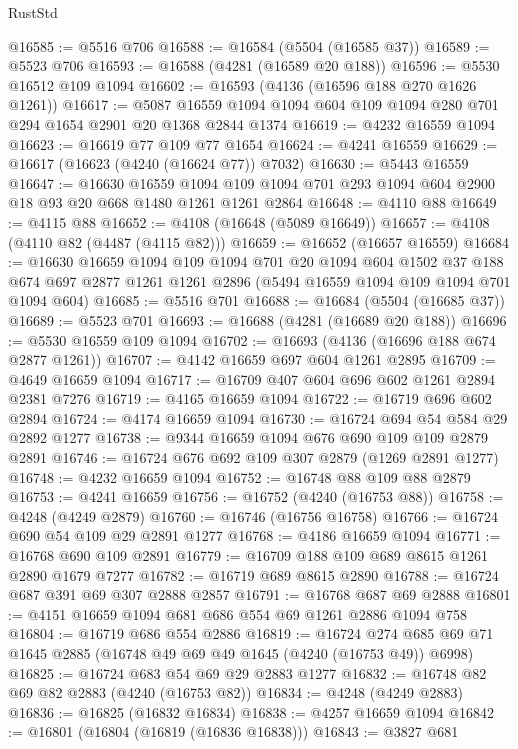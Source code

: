 \begin{lexlean}{RustStd}
\begin{coremodule}
{\begin{coremodule}
{{{{{{{{{{{{{{{{{{{{{{{{{{{{{{{{{{{@16585 := @5516 @706
@16588 := @16584 (@5504 (@16585 @37))
@16589 := @5523 @706
@16593 := @16588 (@4281 (@16589 @20 @188))
@16596 := @5530 @16512 @109 @1094
@16602 := @16593 (@4136 (@16596 @188 @270 @1626 @1261))
@16617 := @5087 @16559 @1094 @1094 @604 @109 @1094 @280 @701 @294 @1654 @2901 @20 @1368 @2844 @1374
@16619 := @4232 @16559 @1094
@16623 := @16619 @77 @109 @77 @1654
@16624 := @4241 @16559
@16629 := @16617 (@16623 (@4240 (@16624 @77)) @7032)
@16630 := @5443 @16559
@16647 := @16630
    @16559
    @1094
    @109
    @1094
    @701
    @293
    @1094
    @604
    @2900
    @18
    @93
    @20
    @668
    @1480
    @1261
    @1261
    @2864
@16648 := @4110 @88
@16649 := @4115 @88
@16652 := @4108 (@16648 (@5089 @16649))
@16657 := @4108 (@4110 @82 (@4487 (@4115 @82)))
@16659 := @16652 (@16657 @16559)
@16684 := @16630
    @16659
    @1094
    @109
    @1094
    @701
    @20
    @1094
    @604
    @1502
    @37
    @188
    @674
    @697
    @2877
    @1261
    @1261
    @2896
    (@5494 @16559 @1094 @109 @1094 @701 @1094 @604)
@16685 := @5516 @701
@16688 := @16684 (@5504 (@16685 @37))
@16689 := @5523 @701
@16693 := @16688 (@4281 (@16689 @20 @188))
@16696 := @5530 @16559 @109 @1094
@16702 := @16693 (@4136 (@16696 @188 @674 @2877 @1261))
@16707 := @4142 @16659 @697 @604 @1261 @2895
@16709 := @4649 @16659 @1094
@16717 := @16709 @407 @604 @696 @602 @1261 @2894 @2381 @7276
@16719 := @4165 @16659 @1094
@16722 := @16719 @696 @602 @2894
@16724 := @4174 @16659 @1094
@16730 := @16724 @694 @54 @584 @29 @2892 @1277
@16738 := @9344 @16659 @1094 @676 @690 @109 @109 @2879 @2891
@16746 := @16724 @676 @692 @109 @307 @2879 (@1269 @2891 @1277)
@16748 := @4232 @16659 @1094
@16752 := @16748 @88 @109 @88 @2879
@16753 := @4241 @16659
@16756 := @16752 (@4240 (@16753 @88))
@16758 := @4248 (@4249 @2879)
@16760 := @16746 (@16756 @16758)
@16766 := @16724 @690 @54 @109 @29 @2891 @1277
@16768 := @4186 @16659 @1094
@16771 := @16768 @690 @109 @2891
@16779 := @16709 @188 @109 @689 @8615 @1261 @2890 @1679 @7277
@16782 := @16719 @689 @8615 @2890
@16788 := @16724 @687 @391 @69 @307 @2888 @2857
@16791 := @16768 @687 @69 @2888
@16801 := @4151 @16659 @1094 @681 @686 @554 @69 @1261 @2886 @1094 @758
@16804 := @16719 @686 @554 @2886
@16819 := @16724 @274 @685 @69 @71 @1645 @2885 (@16748 @49 @69 @49 @1645 (@4240 (@16753 @49)) @6998)
@16825 := @16724 @683 @54 @69 @29 @2883 @1277
@16832 := @16748 @82 @69 @82 @2883 (@4240 (@16753 @82))
@16834 := @4248 (@4249 @2883)
@16836 := @16825 (@16832 @16834)
@16838 := @4257 @16659 @1094
@16842 := @16801 (@16804 (@16819 (@16836 @16838)))
@16843 := @3827 @681
}}}}}}}}}}}}}}}}}}}}}}}}}}}}}}}}}}}
\end{coremodule}}
\end{coremodule}
\end{lexlean}
